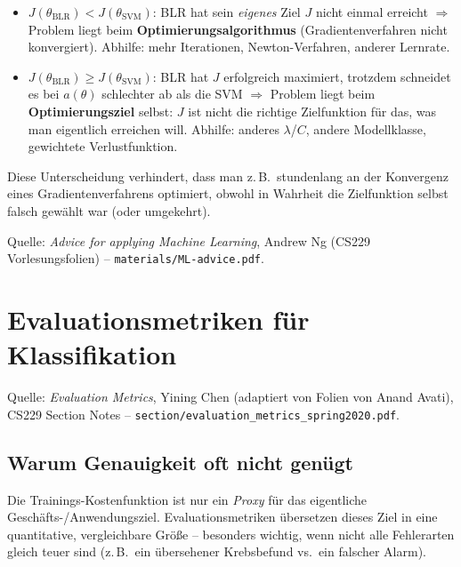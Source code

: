 \documentclass[11pt]{article}
\theoremstyle{csthm}
\theoremstyle{csdef}
\begin{document}
\begin{itemize}
  \item $J(\theta_\text{BLR}) < J(\theta_\text{SVM})$: BLR hat sein
        \emph{eigenes} Ziel $J$ nicht einmal erreicht $\Rightarrow$ Problem
        liegt beim \textbf{Optimierungsalgorithmus} (Gradientenverfahren
        nicht konvergiert). Abhilfe: mehr Iterationen, Newton-Verfahren,
        anderer Lernrate.
  \item $J(\theta_\text{BLR}) \geq J(\theta_\text{SVM})$: BLR hat $J$
        erfolgreich maximiert, trotzdem schneidet es bei $a(\theta)$
        schlechter ab als die SVM $\Rightarrow$ Problem liegt beim
        \textbf{Optimierungsziel} selbst: $J$ ist nicht die richtige
        Zielfunktion für das, was man eigentlich erreichen will. Abhilfe:
        anderes $\lambda$/$C$, andere Modellklasse, gewichtete
        Verlustfunktion.
\end{itemize}

Diese Unterscheidung verhindert, dass man z.\,B.\ stundenlang an der
Konvergenz eines Gradientenverfahrens optimiert, obwohl in Wahrheit die
Zielfunktion selbst falsch gewählt war (oder umgekehrt).

\begin{tcolorbox}[srcstyle]
Quelle: \emph{Advice for applying Machine Learning}, Andrew Ng (CS229
Vorlesungsfolien) -- \texttt{materials/ML-advice.pdf}.
\end{tcolorbox}

\section{Evaluationsmetriken für Klassifikation}

\begin{tcolorbox}[srcstyle]
Quelle: \emph{Evaluation Metrics}, Yining Chen (adaptiert von Folien von
Anand Avati), CS229 Section Notes --
\texttt{section/evaluation\_metrics\_spring2020.pdf}.
\end{tcolorbox}

\subsection{Warum Genauigkeit oft nicht genügt}

Die Trainings-Kostenfunktion ist nur ein \emph{Proxy} für das eigentliche
Geschäfts-/Anwendungsziel. Evaluationsmetriken übersetzen dieses Ziel in
eine quantitative, vergleichbare Größe -- besonders wichtig, wenn nicht
alle Fehlerarten gleich teuer sind (z.\,B.\ ein übersehener Krebsbefund vs.\
ein falscher Alarm).
\end{document}
